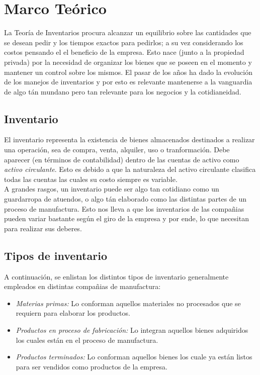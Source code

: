 \documentclass[letterpaper, 12pt]{article}
\begin{document}
    \newpage
    \section*{Marco Teórico}
    \justify
    La Teoría de Inventarios procura alcanzar un equilibrio sobre las cantidades que se desean pedir y los tiempos exactos para pedirlos; a su vez considerando los costos
    pensando el el beneficio de la empresa. Esto nace (junto a la propiedad privada) por la necesidad de organizar los bienes que se poseen en el momento y mantener un control 
    sobre los mismos. El pasar de los años ha dado la evolución de los manejos de inventarios y por esto es relevante mantenerse a la vanguardia de algo tán mundano pero tan relevante para
    los negocios y la cotidianeidad.
    \subsection*{Inventario}
    \justify
    El inventario representa la existencia de bienes almacenados destinados a realizar una operación, sea de compra, venta, alquiler, uso o tranformación. Debe aparecer (en términos de contabilidad) dentro de las cuentas de activo
    como \emph{activo circulante}. Esto es debido a que la naturaleza del activo circulante clasifica todas las cuentas las cuales su costo siempre es variable.
    \\\newline
    A grandes rasgos, un inventario puede ser algo tan cotidiano como un guardarropa de atuendos, o algo tán elaborado como las distintas partes de un proceso de manufactura. Esto nos lleva a que los inventarios de las compañias pueden variar
    bastante según el giro de la empresa y por ende, lo que necesitan para realizar sus deberes.
    \subsection*{Tipos de inventario}
    \justify
    A continuación, se enlistan los distintos tipos de inventario generalmente empleados en distintas compañias de manufactura:
    \begin{itemize}
        \item \emph{Materias primas:} Lo conforman aquellos materiales no procesados que se requiern para elaborar los productos.
        \item \emph{Productos en proceso de fabricación:} Lo integran aquellos bienes adquiridos los cuales están en el proceso de manufactura.
        \item \emph{Productos terminados:} Lo conforman aquellos bienes los cuale ya están listos para ser vendidos como productos de la empresa.
    \end{itemize}
\end{document}
